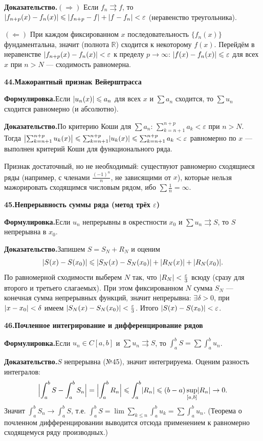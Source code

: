 \documentclass[10pt,a4paper]{article}
\newcommand{\R}{\mathbb{R}}
\newcommand{\eps}{\varepsilon}
\renewcommand{\le}{\leqslant}
\DeclarePairedDelimiter{\abs}{\lvert}{\rvert}
\theoremstyle{definition}
\theoremstyle{plain}
\newcommand{\writespace}{\vspace{7.5mm}}
\newcommand{\prf}[2]{%
  \par\writespace\noindent
  {\large\bfseries\color{accent}#1.\enspace #2}\par\smallskip}
\newcommand{\stmt}{\par\noindent\textbf{Формулировка.}\enspace}
\newcommand{\dok}{\par\noindent\textbf{Доказательство.}\enspace}
\begin{document}
\dok $(\Rightarrow)$ Если $f_n\rightrightarrows f$, то
$\abs{f_{n+p}(x)-f_n(x)}\le\abs{f_{n+p}-f}+\abs{f-f_n}<\eps$ (неравенство треугольника).

$(\Leftarrow)$ При каждом фиксированном $x$ последовательность $\{f_n(x)\}$ фундаментальна, значит
(полнота $\R$) сходится к некоторому $f(x)$. Перейдём в неравенстве $\abs{f_{n+p}(x)-f_n(x)}<\eps$ к
пределу $p\to\infty$: $\abs{f(x)-f_n(x)}\le\eps$ для всех $x$ при $n>N$ — сходимость равномерна.

\prf{44}{Мажорантный признак Вейерштрасса}
\stmt Если $\abs{u_n(x)}\le a_n$ для всех $x$ и $\sum a_n$ сходится, то $\sum u_n$ сходится
равномерно (и абсолютно).

\dok По критерию Коши для $\sum a_n$: $\sum_{k=n+1}^{n+p}a_k<\eps$ при $n>N$. Тогда
$\abs[\big]{\sum_{k=n+1}^{n+p}u_k(x)}\le\sum_{k=n+1}^{n+p}\abs{u_k(x)}\le\sum_{k=n+1}^{n+p}a_k<\eps$
равномерно по $x$ — выполнен критерий Коши для функционального ряда.

Признак достаточный, но не
необходимый: существуют равномерно сходящиеся ряды (например, с членами $\tfrac{(-1)^n}{n}$,
не зависящими от $x$), которые нельзя мажорировать сходящимся числовым рядом, ибо $\sum\tfrac1n=\infty$.

\prf{45}{Непрерывность суммы ряда (метод трёх $\eps$)}
\stmt Если $u_n$ непрерывны в окрестности $x_0$ и $\sum u_n\rightrightarrows S$, то $S$ непрерывна в
$x_0$.

\dok Запишем $S=S_N+R_N$ и оценим
\[
  \abs{S(x)-S(x_0)}\le\abs{S_N(x)-S_N(x_0)}+\abs{R_N(x)}+\abs{R_N(x_0)} .
\]
По равномерной сходимости выберем $N$ так, что $\abs{R_N}<\tfrac\eps3$ всюду (сразу для второго и
третьего слагаемых). При этом фиксированном $N$ сумма $S_N$ — конечная сумма непрерывных функций,
значит непрерывна: $\exists\delta>0$, при $\abs{x-x_0}<\delta$ имеем
$\abs{S_N(x)-S_N(x_0)}<\tfrac\eps3$. Итого $\abs{S(x)-S(x_0)}<\eps$.

\prf{46}{Почленное интегрирование и дифференцирование рядов}
\stmt Если $u_n\in C[a,b]$ и $\sum u_n\rightrightarrows S$, то $\int_a^b S=\sum\int_a^b u_n$.

\dok $S$ непрерывна (№45), значит интегрируема. Оценим разность интегралов:
\[
  \abs[\Big]{\int_a^b S-\int_a^b S_n}=\abs[\Big]{\int_a^b R_n}\le\int_a^b\abs{R_n}
  \le(b-a)\sup_{[a,b]}\abs{R_n}\to0 .
\]
Значит $\int_a^b S_n\to\int_a^b S$, т.е. $\int_a^b S=\lim\sum_{k\le n}\int_a^b u_k=\sum\int_a^b u_n$.
(Теорема о почленном дифференцировании выводится отсюда применением к равномерно сходящемуся ряду
производных.)
\end{document}
